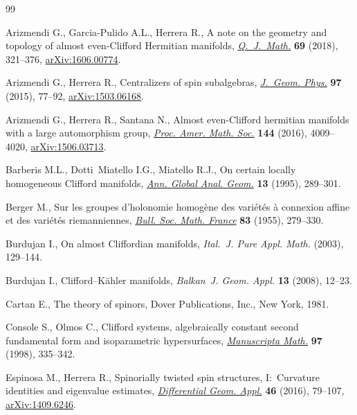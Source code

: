 \documentclass[pdftex]{sigma}
\numberwithin{equation}{section}
\begin{document}
\begin{thebibliography}{99}
\footnotesize\itemsep=0pt

Arizmendi G., Garcia-Pulido A.L., Herrera R., A note on the geometry and
 topology of almost even-{C}lifford {H}ermitian manifolds,
 \href{https://doi.org/10.1093/qmath/hax040}{\textit{Q.~J.~Math.}} \textbf{69} (2018), 321--376, \href{https://arxiv.org/abs/1606.00774}{arXiv:1606.00774}.

Arizmendi G., Herrera R., Centralizers of spin subalgebras, \href{https://doi.org/10.1016/j.geomphys.2015.07.002}{\textit{J.~Geom.
 Phys.}} \textbf{97} (2015), 77--92, \href{https://arxiv.org/abs/1503.06168}{arXiv:1503.06168}.

Arizmendi G., Herrera R., Santana N., Almost even-{C}lifford hermitian
 manifolds with a large automorphism group, \href{https://doi.org/10.1090/proc/13071}{\textit{Proc. Amer. Math. Soc.}}
 \textbf{144} (2016), 4009--4020, \href{https://arxiv.org/abs/1506.03713}{arXiv:1506.03713}.

Barberis M.L., Dotti~Miatello I.G., Miatello R.J., On certain locally
 homogeneous {C}lifford manifolds, \href{https://doi.org/10.1007/BF00773661}{\textit{Ann. Global Anal. Geom.}}
 \textbf{13} (1995), 289--301.

Berger M., Sur les groupes d'holonomie homog\`ene des vari\'{e}t\'{e}s \`a
 connexion affine et des vari\'{e}t\'{e}s riemanniennes, \href{https://doi.org/10.24033/bsmf.1464}{\textit{Bull. Soc.
 Math. France}} \textbf{83} (1955), 279--330.

Burdujan I., On almost {C}liffordian manifolds, \textit{Ital.~J. Pure Appl.
 Math.} (2003), 129--144.

Burdujan I., Clifford--{K}\"{a}hler manifolds, \textit{Balkan~J. Geom. Appl.}
 \textbf{13} (2008), 12--23.

Cartan E., The theory of spinors, Dover Publications, Inc., New York, 1981.

Console S., Olmos C., Clifford systems, algebraically constant second
 fundamental form and isoparametric hypersurfaces, \href{https://doi.org/10.1007/s002290050106}{\textit{Manuscripta Math.}}
 \textbf{97} (1998), 335--342.

Espinosa M., Herrera R., Spinorially twisted spin structures, {I}:~{C}urvature
 identities and eigenvalue estimates, \href{https://doi.org/10.1016/j.difgeo.2016.01.008}{\textit{Differential Geom. Appl.}}
 \textbf{46} (2016), 79--107, \href{https://arxiv.org/abs/1409.6246}{arXiv:1409.6246}.


\end{thebibliography}
\end{document}
